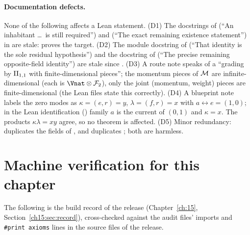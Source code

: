 \paragraph{Documentation defects.}  None of the following affects a Lean statement.
(D1) The docstrings of  (``An inhabitant \dots\ is still required'') and
 (``The exact remaining existence statement'') in
 are stale:  proves the target.
(D2) The module docstring of  (``That identity is the sole
residual hypothesis'') and the docstring of  (``The precise remaining opposite-field identity'')
are stale since .  (D3) A route note speaks of a ``grading by ${\mathrm{II}_{1,1}}$ with finite-dimensional pieces''; the momentum pieces of $\mathcal{M}$ are
infinite-dimensional (each is $\Vnat\otimes\chseventeenF_2$), only the joint (momentum, weight) pieces are finite-dimensional
(the Lean files state this correctly).  (D4) A blueprint note labels the
zero modes as $\kappa=(e,r)=y$, $\lambda=(f,r)=x$ with $a\leftrightarrow e=(1,0)$; in the Lean identification
() family $a$ is the current of $(0,1)$ and $\kappa=x$.  The products $\kappa\lambda=xy$ agree,
so no theorem is affected.  (D5) Minor redundancy:  duplicates the fields of
, and  duplicates ; both are harmless.

\section{Machine verification for this chapter}\label{ch17:sec:audit}

The following is the build record of the release (Chapter~\ref{ch:15}, Section~\ref{ch15:sec:record}), cross-checked
against the audit files' imports and \texttt{\#print axioms} lines in the source files of the release.

